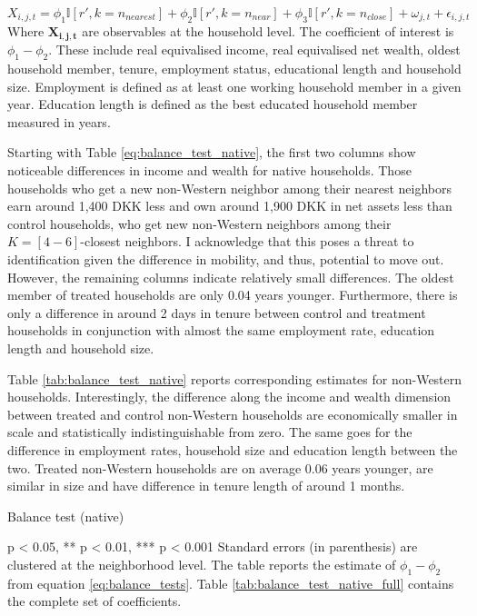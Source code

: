 \documentclass[main.tex]{subfiles}
\begin{document}
\begin{equation}
    X_{i, j, t} = \phi_1 \mathbb{I}[r', k=n_{nearest}] + \phi_2 \mathbb{I}[r', k = n_{near}] + \phi_3 \mathbb{I}[r', k = n_{close}] + \omega_{j, t} + \epsilon_{i, j, t} 
    \label{eq:balance_tests}
\end{equation}
Where $\mathbf{X_{i,j,t}}$ are observables at the household level. The coefficient of interest is $\phi_1 - \phi_2$. These include real equivalised income, real equivalised net wealth, oldest household member, tenure, employment status, educational length and household size. Employment is defined as at least one working household member in a given year. Education length is defined as the best educated household member measured in years.

Starting with Table \ref{eq:balance_test_native}, the first two columns show noticeable differences in income and wealth for native households. Those households who get a new non-Western neighbor among their nearest neighbors earn around 1,400 DKK less and own around 1,900 DKK in net assets less than control households, who get new non-Western neighbors among their $K=[4-6]$-closest neighbors. I acknowledge that this poses a threat to identification given the difference in mobility, and thus, potential to move out. However, the remaining columns indicate relatively small differences. The oldest member of treated households are only 0.04 years younger. Furthermore, there is only a difference in around 2 days in tenure between control and treatment households in conjunction with almost the same employment rate, education length and household size. 

Table \ref{tab:balance_test_native} reports corresponding estimates for non-Western households. Interestingly, the difference along the income and wealth dimension between treated and control non-Western households are economically smaller in scale and statistically indistinguishable from zero. The same goes for the difference in employment rates, household size and education length between the two. Treated non-Western households are on average 0.06 years younger, are similar in size and have difference in tenure length of around 1 months.  

\begin{table}[H]
    \centering
    \caption{Balance test (native)}
    \resizebox{\textwidth}{!}{}
    \label{tab:balance_test_native}
    \begin{tablenotes}[flushleft]
\item \scriptsize * p < 0.05, ** p < 0.01, *** p < 0.001 Standard errors (in parenthesis) are clustered at the neighborhood level. The table reports the estimate of $\phi_1 - \phi_2$ from equation \ref{eq:balance_tests}. Table \ref{tab:balance_test_native_full} contains the complete set of coefficients.
\end{tablenotes}
\end{table}
\end{document}
